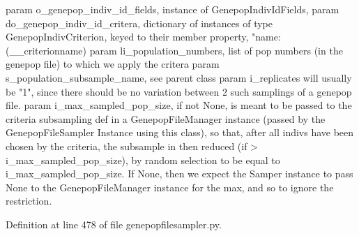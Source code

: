 \begin{DoxyVerb}param o_genepop_indiv_id_fields, instance of GenepopIndivIdFields,
param do_genepop_indiv_id_critera, dictionary of instances of 
type GenepopIndivCriterion, keyed to their member
property, "name: (__criterionname)
param li_population_numbers, list of pop numbers (in the genepop file)
to which we apply the critera
param s_population_subsample_name, see parent class
param i_replicates will usually be "1", since there should be
no variation between 2 such samplings of a genepop file.
param i_max_sampled_pop_size, if not None, is meant to be passed
    to the criteria subsampling def in a GenepopFileManager
    instance (passed by the GenepopFileSampler Instance using this
    class), so that, after all indivs have been chosen by the 
    criteria, the subsample in then reduced (if > i_max_sampled_pop_size),
    by random selection to be equal to i_max_sampled_pop_size.
    If None, then we expect the Samper instance to pass None to 
    the GenepopFileManager instance for the max, and so to ignore
    the restriction.
\end{DoxyVerb}
 

Definition at line 478 of file genepopfilesampler.\+py.



